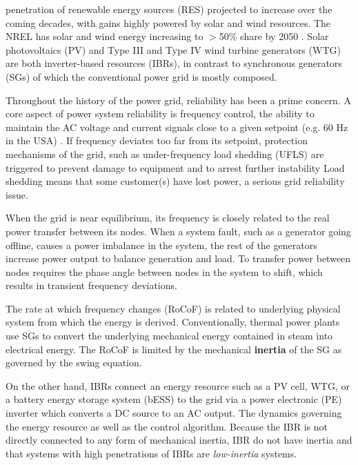  penetration of renewable energy sources (RES)
projected to increase over the coming decades, with gains highly powered by
solar and wind resources. The NREL 
has solar and wind energy increasing to $>$50\% share by 2050
\cite{lin_research_2020}. 
Solar photovoltaics (PV) and Type III and Type IV wind turbine generators
(WTG) are both inverter-based resources (IBRs), in contrast to
synchronous generators (SGs) of which the conventional power grid is
mostly composed.

Throughout the history of the power grid, reliability has been a prime concern.
A core aspect of power system reliability is frequency control, the ability
to maintain the AC voltage and current signals close to a given setpoint
(e.g. 60 Hz in the USA) \cite{anderson_power_2003}. If frequency deviates too far from its setpoint,
protection mechanisms of the grid, such as under-frequency load shedding
(UFLS) are triggered to prevent damage to equipment and to arrest further
instability \cite{denholm_inertia_2020}
Load shedding means that some customer(s) have lost power, a serious grid
reliability issue.


When the grid is near equilibrium, its frequency is closely related
to the real power transfer between its nodes. When a system fault, such as a
generator going offline, causes a power imbalance in the system, 
the rest of the generators increase power output to balance
generation and load. To transfer power between nodes requires the phase angle
between nodes in the system to shift, which results in transient frequency
deviations.

The rate at which frequency changes (RoCoF) is related to underlying physical
system from which the energy is derived. Conventionally,
thermal power plants use SGs to convert the underlying mechanical energy
contained in steam into electrical energy. The RoCoF is limited by
the mechanical {\bf inertia} of the SG as governed by the swing equation.

On the other hand, IBRs connect an energy resource such as a PV cell,
WTG, or a battery energy storage system (bESS) to the grid via a 
power electronic (PE) inverter which converts a DC source to an AC output.
The dynamics governing the energy resource as well as the control algorithm.
Because the IBR is not directly connected to any form of mechanical inertia,
IBR do not have inertia and that systems with high penetrations of IBRs
are {\it low-inertia} systems.

